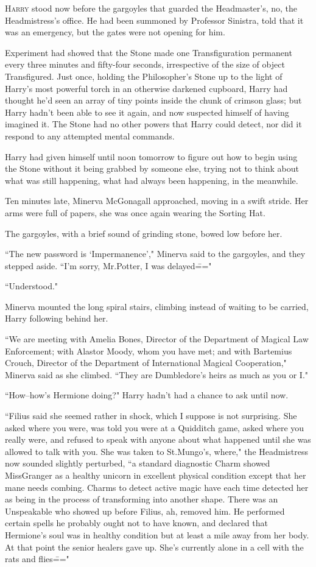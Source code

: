 
\lettrine{H}{arry} stood now before the gargoyles that guarded the Headmaster's, no, the Headmistress's office. He had been summoned by Professor Sinistra, told that it was an emergency, but the gates were not opening for him.

Experiment had showed that the Stone made one Transfiguration permanent every three minutes and fifty-four seconds, irrespective of the size of object Transfigured. Just once, holding the Philosopher's Stone up to the light of Harry's most powerful torch in an otherwise darkened cupboard, Harry had thought he'd seen an array of tiny points inside the chunk of crimson glass; but Harry hadn't been able to see it again, and now suspected himself of having imagined it. The Stone had no other powers that Harry could detect, nor did it respond to any attempted mental commands.

Harry had given himself until noon tomorrow to figure out how to begin using the Stone without it being grabbed by someone else, trying not to think about what was still happening, what had always been happening, in the meanwhile.

Ten minutes late, Minerva McGonagall approached, moving in a swift stride. Her arms were full of papers, she was once again wearing the Sorting Hat.

The gargoyles, with a brief sound of grinding stone, bowed low before her.

``The new password is `Impermanence'," Minerva said to the gargoyles, and they stepped aside. ``I'm sorry, Mr.\?Potter, I was delayed\==="

``Understood."

Minerva mounted the long spiral stairs, climbing instead of waiting to be carried, Harry following behind her.

``We are meeting with Amelia Bones, Director of the Department of Magical Law Enforcement; with Alastor Moody, whom you have met; and with Bartemius Crouch, Director of the Department of International Magical Cooperation," Minerva said as she climbed. ``They are Dumbledore's heirs as much as you or I."

``How\---how's Hermione doing?" Harry hadn't had a chance to ask until now.

``Filius said she seemed rather in shock, which I suppose is not surprising. She asked where you were, was told you were at a Quidditch game, asked where you really were, and refused to speak with anyone about what happened until she was allowed to talk with you. She was taken to St.\?Mungo's, where," the Headmistress now sounded slightly perturbed, ``a standard diagnostic Charm showed Miss\?Granger as a healthy unicorn in excellent physical condition except that her mane needs combing. Charms to detect active magic have each time detected her as being in the process of transforming into another shape. There was an Unspeakable who showed up before Filius, ah, removed him. He performed certain spells he probably ought not to have known, and declared that Hermione's soul was in healthy condition but at least a mile away from her body. At that point the senior healers gave up. She's currently alone in a cell with the rats and flies\==="

